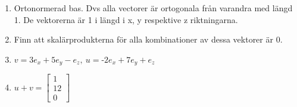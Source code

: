 \begin{enumerate}
\item Ortonormerad bas. Dvs alla vectorer är ortogonala från varandra med längd 1. De vektorerna är 1 i längd i x, y respektive z riktningarna.
\item Finn att skalärprodukterna för alla kombinationer av dessa vektorer är 0.
\item $v=3e_{x}+5e_{y}-e_{z},\ u=\text{-}2e_{x}+7e_{y}+e_{z}$
\item $u+v=\begin{bmatrix}1 \\ 12\\ 0\end{bmatrix}$
\end{enumerate}